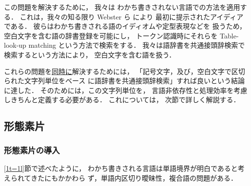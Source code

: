 \begin{description}
  この問題を解決するために，
  我々は
  わかち書きされない言語での方法を適用する．
  これは，我々の知る限り Webster ら\cite{Webster92} により
  最初に提示されたアイディアである．
  彼らはわかち書きされる語のイディオムや定型表現などを
  扱うため，空白文字を含む語の辞書登録を可能にし，
  トークン認識時にそれらを Table-look-up matching という方法で検索をする．
  我々は語辞書を共通接頭辞検索で検索するという方法により，
  空白文字を含む語を扱う．





\end{description}


これらの問題を\underline{同時に}解決するためには，
「記号文字，及び，空白文字で区切られた文字列単位をベース
に語辞書を共通接頭辞検索」すれば良いという結論に達した．
そのためには，この文字列単位を，
言語非依存性と処理効率を考慮しきちんと定義する必要がある．
これについては，
次節で詳しく解説する．




\subsection{形態素片}\label{MF}

\subsubsection{形態素片の導入}\label{MFintro}

\ref{1t=1l}節で述べたように，
わかち書きされる言語は単語境界が明白であると考えられてきたにもかかわら
ず，単語内区切り曖昧性，複合語の問題がある．

